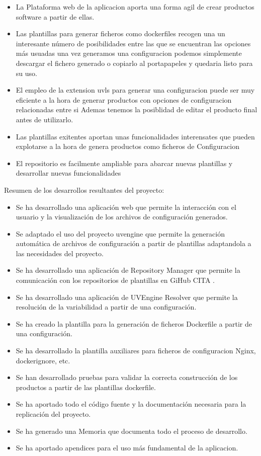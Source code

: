 \documentclass[12pt, a4paper, twoside]{article}
\begin{document}
\begin{itemize}
\item La Plataforma web de la aplicacion aporta una forma agil de crear productos software a partir de ellas.

\item Las plantillas para generar ficheros como dockerfiles recogen una un interesante número de posibilidades entre las que se encuentran las opciones más usuadas
una vez generamos una configuracion podemos simplemente descargar el fichero generado o copiarlo al portapapeles y quedaria listo para su uso.

\item El empleo de la extension uvls para generar una configuracion puede ser muy eficiente a la hora de generar productos con opciones de configuracion relacionadas entre si
Ademas tenemos la posiblidad de editar el producto final antes de utilizarlo.

\item Las plantillas exitentes aportan unas funcionalidades interensates que pueden explotarse a la hora de genera productos como ficheros de Configuracion

\item El repositorio es facilmente ampliable para abarcar nuevas plantillas y desarrollar nuevas funcionalidades
\end{itemize}

\newpage 

Resumen de los desarrollos resultantes del proyecto:
\begin{itemize}
	\item Se ha desarrollado una aplicación web que permite la interacción con el usuario y la visualización de los archivos de configuración generados.
	\item Se adaptado el uso del proyecto uvengine que permite la generación automática de archivos de configuración a partir de plantillas adaptandola a las necesidades del proyecto.
	\item Se ha desarrollado una aplicación de Repository Manager que permite la comunicación con los repositorios de plantillas en GiHub CITA .
	\item Se ha desarrollado una aplicación de UVEngine Resolver que permite la resolución de la variabilidad a partir de una configuración.
	\item Se ha creado la plantilla para la generación de ficheros Dockerfile a partir de una configuración.
	\item Se ha desarrollado la plantilla auxiliares para ficheros de configuracion Nginx, dockerignore, etc.
	\item Se han desarrollado pruebas para validar la correcta construcción de los productos a partir de las plantillas dockerfile.
	\item Se ha aportado todo el código fuente y la documentación necesaria para la replicación del proyecto.
	\item Se ha generado una Memoria que documenta todo el proceso de desarrollo.
	\item Se ha aportado apendices para el uso más fundamental de la aplicacion.
\end{itemize}
\end{document}

